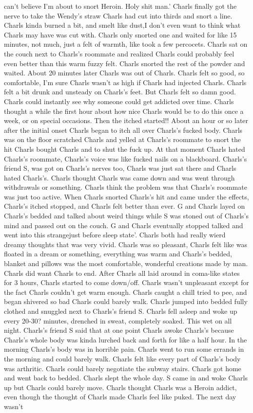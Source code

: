 \documentclass[12pt]{book}
\begin{document}
can't believe I'm about to snort Heroin. Holy shit man.' Charls finally got the nerve to take the Wendy's straw Charls had cut into thirds and snort a line. Charls kinda burned a bit, and smelt like dust,I don't even want to think what Charls may have was cut with. Charls only snorted one and waited for like 15 minutes, not much, just a felt of warmth, like took a few percocets. Charls sat on the couch next to Charls's roommate and realized Charls could probably feel even better than this warm fuzzy felt. Charls snorted the rest of the powder and waited. About 20 minutes later Charls was out of Charls. Charls felt so good, so comfortable, I'm sure Charls wasn't as high if Charls had injected Charls. Charls felt a bit drunk and unsteady on Charls's feet. But Charls felt so damn good. Charls could instantly see why someone could get addicted over time. Charls thought a while the first hour about how nice Charls would be to do this once a week, or on special occasions. Then the itched started!! About an hour or so later after the initial onset Charls began to itch all over Charls's fucked body. Charls was on the floor scratched Charls and yelled at Charls's roommate to snort the hit Charls bought Charls and to shut the fuck up. At that moment Charls hated Charls's roommate, Charls's voice was like fucked nails on a blackboard. Charls's friend S, was got on Charls's nerves too, Charls was just sat there and Charls hated Charls's. Charls thought Charls was came down and was went through withdrawals or something. Charls think the problem was that Charls's roommate was just too active. When Charls snorted Charls's hit and came under the effects, Charls's itched stopped, and Charls felt better than ever. G and Charls layed on Charls's bedded and talked about weird things while S was stoned out of Charls's mind and passed out on the couch. G and Charls eventually stopped talked and went into this strangejust before sleep state'. Charls both had really wierd dreamy thoughts that was very vivid. Charls was so pleasant, Charls felt like was floated in a dream or something, everything was warm and Charls's bedded, blanket and pillows was the most comfortable, wonderful creations made by man. Charls did want Charls to end. After Charls all laid around in coma-like states for 3 hours, Charls started to come down/off. Charls wasn't unpleasant except for the fact Charls couldn't get warm enough. Charls caught a chill tried to pee, and began shivered so bad Charls could barely walk. Charls jumped into bedded fully clothed and snuggled next to Charls's friend S. Charls fell asleep and woke up every 20-30? minutes, drenched in sweat, completely soaked. This wet on all night. Charls's friend S said that at one point Charls awoke Charls's because Charls's whole body was kinda lurched back and forth for like a half hour. In the morning Charls's body was in horrible pain. Charls went to run some errands in the morning and could barely walk. Charls felt like every part of Charls's body was arthritic. Charls could barely negotiate the subway stairs. Charls got home and went back to bedded. Charls slept the whole day. S came in and woke Charls up but Charls could barely move. Charls thought Charls was a Heroin addict, even though the thought of Charls made Charls feel like puked. The next day wasn't 
\end{document}
